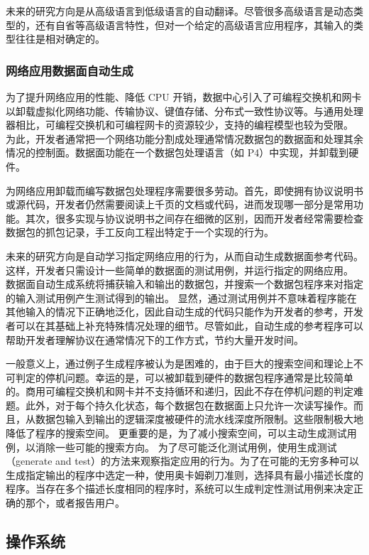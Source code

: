 未来的研究方向是从高级语言到低级语言的自动翻译。尽管很多高级语言是动态类型的，还有自省等高级语言特性，但对一个给定的高级语言应用程序，其输入的类型往往是相对确定的。
\fi

\subsubsection{网络应用数据面自动生成}
\label{future:p4coder}

为了提升网络应用的性能、降低 CPU 开销，数据中心引入了可编程交换机和网卡以卸载虚拟化网络功能、传输协议、键值存储、分布式一致性协议等。与通用处理器相比，可编程交换机和可编程网卡的资源较少，支持的编程模型也较为受限。
为此，开发者通常把一个网络功能分割成处理通常情况数据包的数据面和处理其余情况的控制面。数据面功能在一个数据包处理语言（如 P4）中实现，并卸载到硬件。

为网络应用卸载而编写数据包处理程序需要很多劳动。首先，即使拥有协议说明书或源代码，开发者仍然需要阅读上千页的文档或代码，进而发现哪一部分是常用功能。其次，很多实现与协议说明书之间存在细微的区别，因而开发者经常需要检查数据包的抓包记录，手工反向工程出特定于一个实现的行为。

未来的研究方向是自动学习指定网络应用的行为，从而自动生成数据面参考代码。
这样，开发者只需设计一些简单的数据面的测试用例，并运行指定的网络应用。
数据面自动生成系统将捕获输入和输出的数据包，并搜索一个数据包程序来对指定的输入测试用例产生测试得到的输出。
显然，通过测试用例并不意味着程序能在其他输入的情况下正确地泛化，因此自动生成的代码只能作为开发者的参考，开发者可以在其基础上补充特殊情况处理的细节。尽管如此，自动生成的参考程序可以帮助开发者理解协议在通常情况下的工作方式，节约大量开发时间。


一般意义上，通过例子生成程序被认为是困难的，由于巨大的搜索空间和理论上不可判定的停机问题。幸运的是，可以被卸载到硬件的数据包程序通常是比较简单的。商用可编程交换机和网卡并不支持循环和递归，因此不存在停机问题的判定难题。此外，对于每个持久化状态，每个数据包在数据面上只允许一次读写操作。而且，从数据包输入到输出的逻辑深度被硬件的流水线深度所限制。这些限制极大地降低了程序的搜索空间。
更重要的是，为了减小搜索空间，可以主动生成测试用例，以消除一些可能的搜索方向。
为了尽可能泛化测试用例，使用生成测试（generate and test）的方法来观察指定应用的行为。为了在可能的无穷多种可以生成指定输出的程序中选定一种，使用奥卡姆剃刀准则，选择具有最小描述长度的程序。当存在多个描述长度相同的程序时，系统可以生成判定性测试用例来决定正确的那个，或者报告用户。



\subsection{操作系统}
\label{future:os}

